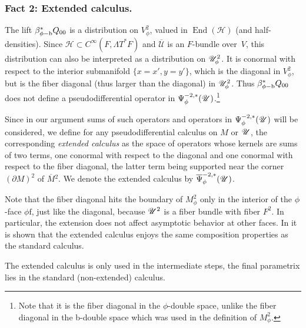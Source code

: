 \documentclass[11pt]{article}
\numberwithin{equation}{section}
\newcommand{\phib}{{\phi\textup{-}\bb}}
\theoremstyle{plain}
\theoremstyle{definition}
\newcommand{\Umathbar}{{\overline{\mathscr{U}}}}
\newcommand{\phif}{{\phi\mathrm{f}}}
\newcommand{\bb}{{\mathrm{b}}}
\DeclareMathOperator{\End}{End}
\newcommand{\Cinf}{C^\infty}
\newcommand{\Mbar}{{\overline{M}}}\let\M\Mbar
\newcommand{\Psibar}{\overline{\Psi}}
\begin{document}
\subsubsection*{Fact 2: Extended calculus.}
The lift $\beta_{\phib}^* Q_{00}$ is a distribution on $V^2_\phi$, valued in $\End(\mathscr{H})$
(and half-densities). Since $\mathscr{H}\!\subset\!\Cinf(F,\Lambda T^*F)$ and $\Umathbar$ is an $F$-bundle over~$V$, this distribution can also be interpreted as a distribution on $\mathscr{U}^2_\phi$. It is conormal with respect to the interior submanifold $\{x=x', y=y'\}$, which is the diagonal in $V^2_\phi$, but is the fiber diagonal (thus larger than the diagonal) in $\mathscr{U}^2_\phi$. Thus $\beta_{\phib}^* Q_{00}$ does not define a pseudodifferential operator in $\Psi^{-2, *}_\phi(\mathscr{U})$.\footnote{Note that it is the fiber diagonal in the $\phi$-double space, unlike the fiber diagonal in the b-double space which was used in the definition of $M^2_\phi$.}

Since in our argument sums of such operators and operators in $\Psi^{-2,*}_\phi(\mathscr{U})$ will be considered, we
define for any pseudodifferential calculus on $M$ or $\mathscr{U}$, the corresponding \textit{extended calculus} as
the space of operators whose kernels are sums of two terms, one conormal with respect to the diagonal and one conormal with respect to the fiber diagonal, the latter term being supported near the corner $(\partial M)^2$ of $\Mbar{}^2$.
We denote the extended calculus by $\Psibar^{-2,*}_\phi(\U)$.

Note that the fiber diagonal hits the boundary of $M^2_\phi$ only in the interior of the $\phi$\nobreakdash-face $\phif$,
just like the diagonal, because $\mathscr{U}^2$ is a fiber bundle with fiber $F^2$. In particular, the extension
does not affect asymptotic behavior at other faces. In \cite[Prop.\,2]{grieser-para} it is shown that the
extended calculus enjoys the same composition properties as the standard calculus.

The extended calculus is only used in the intermediate steps, the final parametrix lies in the standard (non-extended) calculus.
\end{document}

